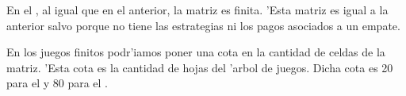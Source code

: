 En el , al igual que en el anterior, la matriz es finita. 'Esta matriz es igual a la anterior salvo porque no tiene las estrategias ni los pagos asociados a un empate.

En los juegos finitos podr'iamos poner una cota en la cantidad de celdas de la matriz. 'Esta cota es la cantidad de hojas del 'arbol de juegos. Dicha cota es 20 para el  y 80 para el .


